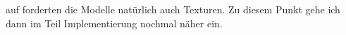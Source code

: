 auf forderten die Modelle natürlich auch Texturen. Zu diesem Punkt gehe ich dann im Teil Implementierung nochmal näher ein.
